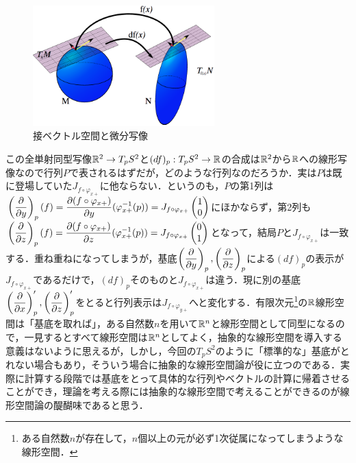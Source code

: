 \begin{figure}[h]
  \begin{center} 
    \includegraphics[width=7.0cm]{dev_diff}
    \caption{接ベクトル空間と微分写像}
  \end{center}
\end{figure}

この全単射同型写像${\mathbb R}^2\rightarrow T_pS^2$と$(df)_p:T_pS^2\rightarrow {\mathbb R}$の合成は${\mathbb R}^2$から${\mathbb R}$への線形写像なので行列$P$で表されるはずだが，どのような行列なのだろうか．実は$P$は既に登場していた$J_{f\circ\varphi_{x+}}$に他ならない．というのも，$P$の第1列は$\left(\displaystyle\frac{\partial}{\partial y}\right)_p(f)=\displaystyle\frac{\partial (f\circ\varphi_{x+})}{\partial y}(\varphi_{x+}^{-1}(p))=J_{f\circ\varphi_{x+}}\begin{pmatrix} 1 \\ 0\end{pmatrix}$にほかならず，第2列も$\left(\displaystyle\frac{\partial}{\partial z}\right)_p(f)=\displaystyle\frac{\partial (f\circ\varphi_{x+})}{\partial z}(\varphi_{x+}^{-1}(p))=J_{f\circ\varphi_{x+}}\begin{pmatrix} 0 \\ 1 \end{pmatrix}$となって，結局$P$と$J_{f\circ\varphi_{x+}}$は一致する．重ね重ねになってしまうが，基底$\left(\displaystyle\frac{\partial}{\partial y}\right)_p,\left(\displaystyle\frac{\partial}{\partial z}\right)_p$による$(df)_p$の表示が$J_{f\circ\varphi_{x+}}$であるだけで，$(df)_p$そのものと$J_{f\circ\varphi_{x+}}$は違う．現に別の基底$\left(\displaystyle\frac{\partial}{\partial x}\right)_p',\left(\displaystyle\frac{\partial}{\partial z}\right)_p'$をとると行列表示は$J_{f\circ\varphi_{y+}}$へと変化する．有限次元\footnote{ある自然数$n$が存在して，$n$個以上の元が必ず1次従属になってしまうような線形空間．}の${\mathbb R}$線形空間は「基底を取れば」，ある自然数$n$を用いて${\mathbb R}^n$と線形空間として同型になるので，一見するとすべて線形空間は${\mathbb R}^n$としてよく，抽象的な線形空間を導入する意義はないように思えるが，しかし，今回の$T_pS^2$のように「標準的な」基底がとれない場合もあり，そういう場合に抽象的な線形空間論が役に立つのである．実際に計算する段階では基底をとって具体的な行列やベクトルの計算に帰着させることができ，理論を考える際には抽象的な線形空間で考えることができるのが線形空間論の醍醐味であると思う．



